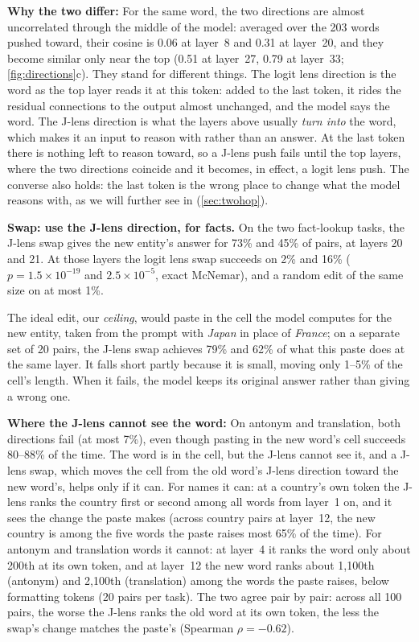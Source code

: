 \documentclass{vgtc}       %
\newcommand{\LL}{logit lens}
\newcommand{\JL}{J-lens}
\begin{document}
\textbf{Why the two differ:} For the same word, the two directions are almost uncorrelated through the middle of the
model: averaged over the 203 words pushed toward, their cosine is 0.06 at layer~8 and 0.31 at layer~20, and they
become similar only near the top (0.51 at layer~27, 0.79 at layer~33; \cref{fig:directions}c). They stand for
different things. The \LL{} direction is the word as the top layer reads it at this token: added to the last token,
it rides the residual connections to the output almost unchanged, and the model says the word.
The \JL{} direction is
what the layers above usually \emph{turn into} the word, which makes it an input to reason with rather than an
answer. At the last token there is nothing left to reason toward, so a \JL{} push fails until the top layers, where
the two directions coincide and it becomes, in effect, a \LL{} push. The converse also holds: the last token is the
wrong place to change what the model reasons with, as we will further see in (\cref{sec:twohop}).


\textbf{Swap: use the \JL{} direction, for facts.} On the two fact-lookup tasks, the \JL{} swap gives the new
entity's answer for 73\% and 45\% of pairs, at layers 20 and 21. At those layers the \LL{} swap succeeds on 2\% and
16\% ($p=1.5\times10^{-19}$ and $2.5\times10^{-5}$, exact McNemar), and a random edit of the same size on at most
1\%.

The ideal edit, our \emph{ceiling}, would paste in the cell the model computes for the new entity, taken from
the prompt with \emph{Japan} in place of \emph{France}; on a separate set of 20 pairs, the \JL{} swap achieves 79\%
and 62\% of what this paste does at the same layer. It falls short partly because it is small, moving only 1--5\% of
the cell's length. When it fails, the model keeps its original answer rather than giving a wrong one.


\textbf{Where the \JL{} cannot see the word:} On antonym and translation, both directions fail (at most 7\%), even
though pasting in the new word's cell succeeds 80--88\% of the time. The word is in the cell, but the \JL{} cannot
see it, and a \JL{} swap, which moves the cell from the old word's \JL{} direction toward the new word's, helps only
if it can. For names it can: at a country's own token the \JL{} ranks the country first or second among all words
from layer~1 on, and it sees the change the paste makes (across country pairs at layer~12, the new country is among
the five words the paste raises most 65\% of the time). For antonym and translation words it cannot: at layer~4 it
ranks the word only about 200th at its own token, and at layer~12 the new word ranks about 1{,}100th (antonym) and
2{,}100th (translation) among the words the paste raises, below formatting tokens (20 pairs per task). The two agree
pair by pair: across all 100 pairs, the worse the \JL{} ranks the old word at its own token, the less the swap's
change matches the paste's (Spearman $\rho=-0.62$).
\end{document}
